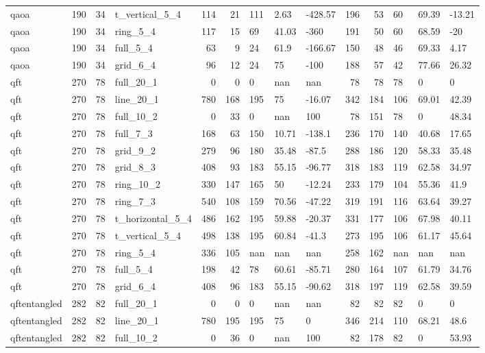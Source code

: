 \begin{longtable}{lrrlrrlllrrlll}
qaoa & 190 & 34 & t\_vertical\_5\_4 & 114 & 21 & 111 & 2.63 & -428.57 & 196 & 53 & 60 & 69.39 & -13.21 \\
qaoa & 190 & 34 & ring\_5\_4 & 117 & 15 & 69 & 41.03 & -360 & 191 & 50 & 60 & 68.59 & -20 \\
qaoa & 190 & 34 & full\_5\_4 & 63 & 9 & 24 & 61.9 & -166.67 & 150 & 48 & 46 & 69.33 & 4.17 \\
qaoa & 190 & 34 & grid\_6\_4 & 96 & 12 & 24 & 75 & -100 & 188 & 57 & 42 & 77.66 & 26.32 \\
qft & 270 & 78 & full\_20\_1 & 0 & 0 & 0 & nan & nan & 78 & 78 & 78 & 0 & 0 \\
qft & 270 & 78 & line\_20\_1 & 780 & 168 & 195 & 75 & -16.07 & 342 & 184 & 106 & 69.01 & 42.39 \\
qft & 270 & 78 & full\_10\_2 & 0 & 33 & 0 & nan & 100 & 78 & 151 & 78 & 0 & 48.34 \\
qft & 270 & 78 & full\_7\_3 & 168 & 63 & 150 & 10.71 & -138.1 & 236 & 170 & 140 & 40.68 & 17.65 \\
qft & 270 & 78 & grid\_9\_2 & 279 & 96 & 180 & 35.48 & -87.5 & 288 & 186 & 120 & 58.33 & 35.48 \\
qft & 270 & 78 & grid\_8\_3 & 408 & 93 & 183 & 55.15 & -96.77 & 318 & 183 & 119 & 62.58 & 34.97 \\
qft & 270 & 78 & ring\_10\_2 & 330 & 147 & 165 & 50 & -12.24 & 233 & 179 & 104 & 55.36 & 41.9 \\
qft & 270 & 78 & ring\_7\_3 & 540 & 108 & 159 & 70.56 & -47.22 & 319 & 191 & 116 & 63.64 & 39.27 \\
qft & 270 & 78 & t\_horizontal\_5\_4 & 486 & 162 & 195 & 59.88 & -20.37 & 331 & 177 & 106 & 67.98 & 40.11 \\
qft & 270 & 78 & t\_vertical\_5\_4 & 498 & 138 & 195 & 60.84 & -41.3 & 273 & 195 & 106 & 61.17 & 45.64 \\
qft & 270 & 78 & ring\_5\_4 & 336 & 105 & nan & nan & nan & 258 & 162 & nan & nan & nan \\
qft & 270 & 78 & full\_5\_4 & 198 & 42 & 78 & 60.61 & -85.71 & 280 & 164 & 107 & 61.79 & 34.76 \\
qft & 270 & 78 & grid\_6\_4 & 408 & 96 & 183 & 55.15 & -90.62 & 318 & 197 & 119 & 62.58 & 39.59 \\
qftentangled & 282 & 82 & full\_20\_1 & 0 & 0 & 0 & nan & nan & 82 & 82 & 82 & 0 & 0 \\
qftentangled & 282 & 82 & line\_20\_1 & 780 & 195 & 195 & 75 & 0 & 346 & 214 & 110 & 68.21 & 48.6 \\
qftentangled & 282 & 82 & full\_10\_2 & 0 & 36 & 0 & nan & 100 & 82 & 178 & 82 & 0 & 53.93 \\

\end{longtable}
